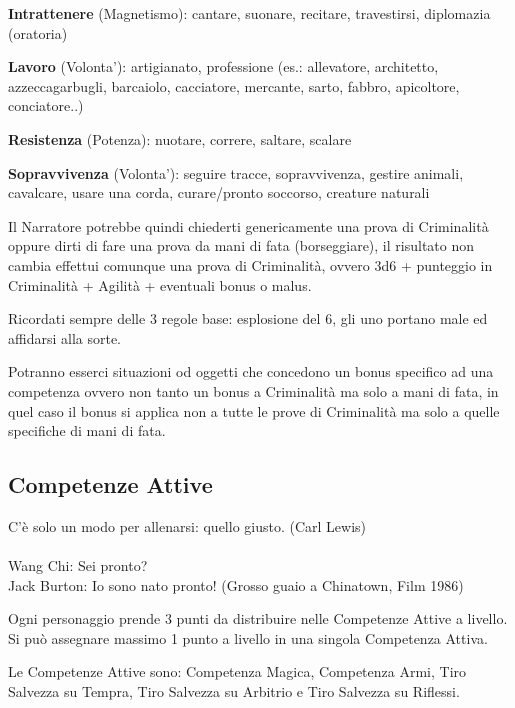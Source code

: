 \documentclass[a4paper,11pt,twoside,openany]{book}
\begin{document}
\textbf{Intrattenere} (Magnetismo): cantare, suonare, recitare, travestirsi, diplomazia (oratoria)

\textbf{Lavoro} (Volonta'): artigianato, professione (es.: allevatore, architetto, azzeccagarbugli, barcaiolo, cacciatore, mercante, sarto, fabbro, apicoltore, conciatore..)

\textbf{Resistenza} (Potenza): nuotare, correre, saltare, scalare

\textbf{Sopravvivenza} (Volonta'): seguire tracce, sopravvivenza, gestire animali, cavalcare, usare una corda, curare/pronto soccorso, creature naturali

\bigskip

Il Narratore potrebbe quindi chiederti genericamente una prova di Criminalità oppure dirti di fare una prova da mani di fata (borseggiare), il risultato non cambia effettui comunque una prova di Criminalità, ovvero 3d6 + punteggio in Criminalità + Agilità + eventuali bonus o malus.

Ricordati sempre delle 3 regole base: esplosione del 6, gli uno portano male ed affidarsi alla sorte.

\bigskip

Potranno esserci situazioni od oggetti che concedono un bonus specifico ad una competenza ovvero non tanto un bonus a Criminalità ma solo a mani di fata, in quel caso il bonus si applica non a tutte le prove di Criminalità ma solo a quelle specifiche di mani di fata.


\subsection{Competenze Attive}

\label{competenze-attive}
\begin{tcolorbox}[enhanced,arc=5pt,boxrule=0.3pt]{C'è solo un modo per allenarsi: quello giusto. (Carl Lewis)\\\\
		Wang Chi: Sei pronto?\\
		Jack Burton: Io sono nato pronto! (Grosso guaio a Chinatown, Film 1986)
	}\end{tcolorbox}\medskip

Ogni personaggio prende 3 punti da distribuire nelle Competenze Attive a livello. Si può assegnare massimo 1 punto a livello in una singola Competenza Attiva.

Le Competenze Attive sono: Competenza Magica, Competenza Armi, Tiro Salvezza su Tempra, Tiro Salvezza su Arbitrio e Tiro Salvezza su Riflessi.
\end{document}
